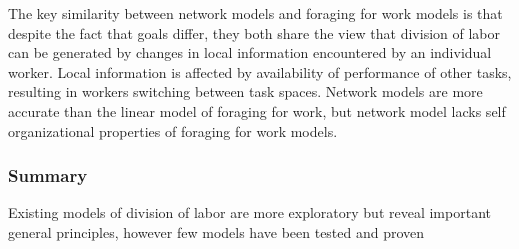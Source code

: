 The key similarity between network models and foraging for work models is that despite the fact that goals differ, they both share the view that division of labor can be generated by changes in local information encountered by an individual worker. Local information is affected by availability of performance of other tasks, resulting in workers switching between task spaces. Network models are more accurate than the linear model of foraging for work, but network model lacks self organizational properties of foraging for work models.

\subsubsection{Summary} 
Existing models of division of labor are more exploratory but reveal important general principles, however few models have been tested and proven



